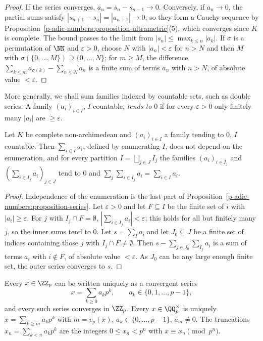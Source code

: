\begin{proof}
If the series converges, $a_n = s_n - s_{n-1} \to 0$. Conversely, if $a_n \to 0$, the partial sums satisfy $|s_{n+1} - s_n| = |a_{n+1}| \to 0$, so they form a Cauchy sequence by
Proposition~\ref{p-adic-numbers:proposition-ultrametric}(5), which converges since $K$ is complete. The bound passes to the limit from $|s_n| \leq \max_{k \leq n}|a_k|$. If $\sigma$ is a permutation of
$\NN$ and $\varepsilon > 0$, choose $N$ with $|a_n| < \varepsilon$ for $n > N$ and then $M$ with $\sigma(\{0, \ldots, M\}) \supseteq \{0, \ldots, N\}$; for $m \geq M$, the difference
$\sum_{k \leq m}a_{\sigma(k)} - \sum_{n \leq N}a_n$ is a finite sum of terms $a_n$ with $n > N$, of absolute value $< \varepsilon$.
\end{proof}

More generally, we shall sum families indexed by countable sets, such as double series. A family $(a_i)_{i \in I}$, $I$ countable, \emph{tends to $0$} if for every $\varepsilon > 0$ only finitely many
$|a_i|$ are $\geq \varepsilon$.

\begin{lemma}\label{p-adic-numbers:lemma-summable}
Let $K$ be complete non-archimedean and $(a_i)_{i \in I}$ a family tending to $0$, $I$ countable. Then $\sum_{i \in I}a_i$, defined by enumerating $I$, does not depend on the enumeration, and for every
partition $I = \bigsqcup_{j \in J}I_j$ the families $(a_i)_{i \in I_j}$ and $(\sum_{i \in I_j}a_i)_{j \in J}$ tend to $0$ and $\sum_{j}\sum_{i \in I_j}a_i = \sum_{i \in I}a_i$.
\end{lemma}

\begin{proof}
Independence of the enumeration is the last part of Proposition~\ref{p-adic-numbers:proposition-series}. Let $\varepsilon > 0$ and let $F \subseteq I$ be the finite set of $i$ with $|a_i| \geq \varepsilon$.
For $j$ with $I_j \cap F = \emptyset$, $|\sum_{i \in I_j}a_i| < \varepsilon$; this holds for all but finitely many $j$, so the inner sums tend to $0$. Let $s = \sum_Ia_i$ and let $J_0 \subseteq J$ be a finite
set of indices containing those $j$ with $I_j \cap F \neq \emptyset$. Then $s - \sum_{j \in J_0}\sum_{I_j}a_i$ is a sum of terms $a_i$ with $i \notin F$, of absolute value $< \varepsilon$. As $J_0$ can be any
large enough finite set, the outer series converges to $s$.
\end{proof}

\begin{theorem}\label{p-adic-numbers:theorem-expansions}
Every $x \in \ZZ_p$ can be written uniquely as a convergent series
\[
x = \sum_{k \geq 0}a_kp^k, \qquad a_k \in \{0, 1, \ldots, p - 1\},
\]
and every such series converges in $\ZZ_p$. Every $x \in \QQ_p^\times$ is uniquely $x = \sum_{k \geq m}a_kp^k$ with $m = v_p(x)$, $a_k \in \{0, \ldots, p - 1\}$, $a_m \neq 0$. The truncations
$x_n = \sum_{k < n}a_kp^k$ are the integers $0 \leq x_n < p^n$ with $x \equiv x_n \pmod{p^n}$.
\end{theorem}

